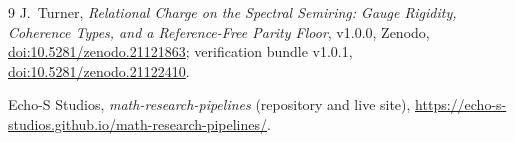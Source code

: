 \documentclass[11pt]{article}
\theoremstyle{definition}
\begin{document}
\begin{thebibliography}{9}
J.~Turner,
\emph{Relational Charge on the Spectral Semiring: Gauge Rigidity, Coherence
Types, and a Reference-Free Parity Floor}, v1.0.0, Zenodo,
\href{https://doi.org/10.5281/zenodo.21121863}{doi:10.5281/zenodo.21121863};
verification bundle v1.0.1,
\href{https://doi.org/10.5281/zenodo.21122410}{doi:10.5281/zenodo.21122410}.

Echo-S Studios, \emph{math-research-pipelines} (repository and live site),
\url{https://echo-s-studios.github.io/math-research-pipelines/}.
\end{thebibliography}
\end{document}
